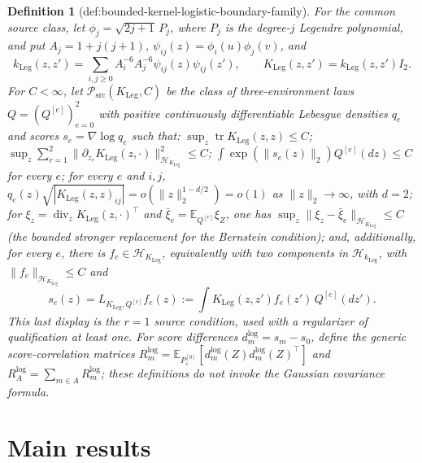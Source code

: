 \documentclass{article}
\newtheorem{definition}{Definition}
\begin{document}
\begin{definition}[def:bounded-kernel-logistic-boundary-family]
For the common source class, let \(\phi_j=\sqrt{2j+1}\,P_j\), where \(P_j\) is the degree-\(j\) Legendre polynomial, and put \(A_j=1+j(j+1)\), \(\psi_{ij}(z)=\phi_i(u)\phi_j(v)\), and
\[
 k_{\mathrm{Leg}}(z,z')=
 \sum_{i,j\ge0}A_i^{-6}A_j^{-6}\psi_{ij}(z)\psi_{ij}(z'),
 \qquad
 K_{\mathrm{Leg}}(z,z')=k_{\mathrm{Leg}}(z,z')I_2.
\]
For \(C<\infty\), let \(\mathcal P_{\mathrm{src}}(K_{\mathrm{Leg}},C)\) be the class of three-environment laws \(Q=(Q^{[e]})_{e=0}^2\) with positive continuously differentiable Lebesgue densities \(q_e\) and scores \(s_e=\nabla\log q_e\) such that: \(\sup_z\operatorname{tr}K_{\mathrm{Leg}}(z,z)\le C\); \(\sup_z\sum_{r=1}^2\|\partial_{z_r}K_{\mathrm{Leg}}(z,\cdot)\|_{\mathcal H_{K_{\mathrm{Leg}}}}^2\le C\); \(\int\exp(\|s_e(z)\|_2)Q^{[e]}(dz)\le C\) for every \(e\); for every \(e\) and \(i,j\), \(q_e(z)\sqrt{|K_{\mathrm{Leg}}(z,z)_{ij}|}=o(\|z\|_2^{1-d/2})=o(1)\) as \(\|z\|_2\to\infty\), with \(d=2\); for \(\xi_z=\operatorname{div}_z K_{\mathrm{Leg}}(z,\cdot)^\top\) and \(\bar\xi_e=\mathbb E_{Q^{[e]}}\xi_Z\), one has \(\sup_z\|\xi_z-\bar\xi_e\|_{\mathcal H_{K_{\mathrm{Leg}}}}\le C\) (the bounded stronger replacement for the Bernstein condition); and, additionally, for every \(e\), there is \(f_e\in\mathcal H_{K_{\mathrm{Leg}}}\), equivalently with two components in \(\mathcal H_{k_{\mathrm{Leg}}}\), with \(\|f_e\|_{\mathcal H_{K_{\mathrm{Leg}}}}\le C\) and
\[
 s_e(z)=L_{K_{\mathrm{Leg}},Q^{[e]}}f_e(z)
 :=\int K_{\mathrm{Leg}}(z,z')f_e(z')\,Q^{[e]}(dz').
\] This last display is the \(r=1\) source condition, used with a regularizer of qualification at least one. For score differences \(d_m^{\mathrm{log}}=s_m-s_0\), define the generic score-correlation matrices \(R_m^{\mathrm{log}}=\mathbb E_{P_{\varepsilon}^{[0]}}[d_m^{\mathrm{log}}(Z)d_m^{\mathrm{log}}(Z)^\top]\) and \(R_A^{\mathrm{log}}=\sum_{m\in A}R_m^{\mathrm{log}}\); these definitions do not invoke the Gaussian covariance formula.
\end{definition}

\section{Main results}
\end{document}
